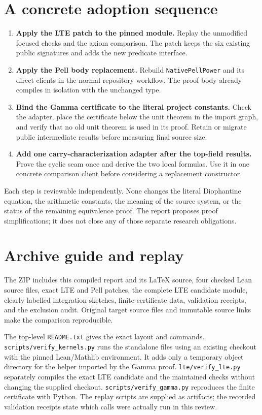 \documentclass[11pt]{article}
\newcommand{\code}[1]{\nolinkurl{#1}}
\begin{document}
\section{A concrete adoption sequence}
\begin{enumerate}
\item \textbf{Apply the LTE patch to the pinned module.} Replay the unmodified
focused checks and the axiom comparison. The patch keeps the six existing public
signatures and adds the new predicate interface.
\item \textbf{Apply the Pell body replacement.} Rebuild
\code{NativePellPower} and its direct clients in the normal repository
workflow. The proof body already compiles in isolation with the unchanged type.
\item \textbf{Bind the Gamma certificate to the literal project constants.}
Check the adapter, place the certificate below the unit theorem in the import
graph, and verify that no old unit theorem is used in its proof. Retain or
migrate public intermediate results before measuring final source size.
\item \textbf{Add one carry-characterization adapter after the top-field
results.} Prove the cyclic seam once and derive the two local formulas. Use it
in one concrete comparison client before considering a replacement constructor.
\end{enumerate}

Each step is reviewable independently. None changes the literal Diophantine
equation, the arithmetic constants, the meaning of the source system, or the
status of the remaining equivalence proof. The report proposes proof
simplifications; it does not close any of those separate research obligations.

\appendix
\section{Archive guide and replay}
The ZIP includes this compiled report and its LaTeX source, four checked Lean
source files, exact LTE and Pell patches, the complete LTE candidate module,
clearly labelled integration sketches, finite-certificate data, validation
receipts, and the exclusion audit. Original target source files and immutable
source links make the comparison reproducible.

The top-level \code{README.txt} gives the exact layout and commands.
\code{scripts/verify_kernels.py} runs the standalone files using an existing
checkout with the pinned Lean/Mathlib environment. It adds only a temporary
object directory for the helper imported by the Gamma proof.
\code{lte/verify_lte.py} separately compiles the exact LTE candidate and the
maintained checks without changing the supplied checkout.
\code{scripts/verify_gamma.py} reproduces the finite certificate with Python.
The replay scripts are supplied as artifacts; the recorded validation receipts
state which calls were actually run in this review.
\end{document}
